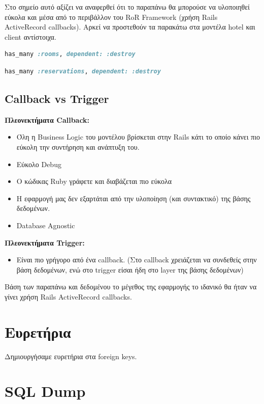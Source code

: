 \documentclass[a4paper,12pt]{article}
\begin{document}
Στο σημείο αυτό αξίζει να αναφερθεί ότι το παραπάνω θα μπορούσε να υλοποιηθεί εύκολα και μέσα από το περιβάλλον του RoR Framework (χρήση Rails ActiveRecord callbacks). Αρκεί να προστεθούν τα παρακάτω στα μοντέλα hotel και client αντίστοιχα.

\begin{lstlisting}[language=Ruby]
has_many :rooms, dependent: :destroy
\end{lstlisting}

\begin{lstlisting}[language=Ruby]
has_many :reservations, dependent: :destroy
\end{lstlisting}

\subsection{Callback vs Trigger}
	\textbf{Πλεονεκτήματα Callback:}
	\begin{itemize}
	  \item Όλη η Business Logic του μοντέλου βρίσκεται στην Rails κάτι το οποίο κάνει πιο εύκολη την συντήρηση και ανάπτυξη του.
	  \item Εύκολο Debug
	  \item Ο κώδικας Ruby γράφετε και διαβάζεται πιο εύκολα
	  \item Η εφαρμογή μας δεν εξαρτάται από την υλοποίηση (και συντακτικό) της βάσης δεδομένων.
	  \item Database Agnostic
	\end{itemize}
	\textbf{Πλεονεκτήματα Trigger:}
	\begin{itemize}
	  \item Είναι πιο γρήγορο από ένα callback. (Στο callback χρειάζεται να συνδεθείς στην βάση δεδομένων, ενώ στο trigger είσαι ήδη στο layer της βάσης δεδομένων)
	\end{itemize}
	Βάση των παραπάνω και δεδομένου το μέγεθος της εφαρμογής το ιδανικό θα ήταν να γίνει χρήση Rails ActiveRecord callbacks.	

\section{Ευρετήρια}
Δημιουργήσαμε ευρετήρια στα foreign keys.


\section{SQL Dump}

\end{document}
